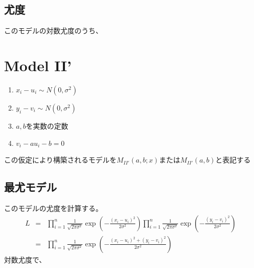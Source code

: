 \subsection{尤度}
このモデルの対数尤度のうち、
\fi

\section{Model II'}

\begin{enumerate}
 \item $x_i-u_i \sim N(0,\sigma^2)$
 \item $y_i-v_i \sim N(0,\sigma^2)$
 \item $a,b$を実数の定数
 \item $v_i -a u_i -b = 0$
\end{enumerate}
この仮定により構築されるモデルを$M_{II'}(a,b; x)$または$M_{II'}(a,b)$と表記する

\subsection{最尤モデル}
このモデルの尤度を計算する。
\begin{eqnarray*}
 L &=& \prod_{i=1}^{n}\frac{1}{\sqrt{2\pi\sigma^2}}\exp\left(-\frac{(x_i-u_i)^2}{2\sigma^2} \right)\prod_{i=1}^{n}\frac{1}{\sqrt{2\pi\sigma^2}}\exp\left(-\frac{(y_i-v_i)^2}{2\sigma^2} \right)\\
 &=& \prod_{i=1}^{n}\frac{1}{\sqrt{2\pi\sigma^2}}\exp\left(-\frac{(x_i-u_i)^2+(y_i-v_i)^2}{2\sigma^2} \right)
\end{eqnarray*}
対数尤度で、

